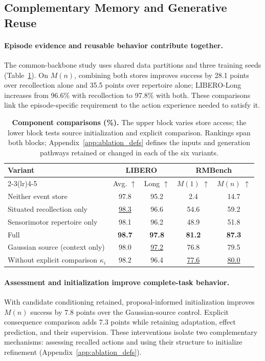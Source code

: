 \subsection{Complementary Memory and Generative Reuse}
\label{sec:ablations}
\paragraph{Episode evidence and reusable behavior contribute together.}
The common-backbone study uses shared data partitions and three training seeds (Table~\ref{tab:ablation}).
On $M(n)$, combining both stores improves success by 28.1 points over recollection alone and 35.5 points over repertoire alone; LIBERO-Long increases from 96.6\% with recollection to 97.8\% with both.
These comparisons link the episode-specific requirement to the action experience needed to satisfy it.
\begin{table}[t]
\centering
\small
\setlength{\tabcolsep}{12pt}
\renewcommand{\arraystretch}{1.08}
\caption{\textbf{Component comparisons (\%).} The upper block varies store access; the lower block tests source initialization and explicit comparison. Rankings span both blocks; Appendix~\ref{app:ablation_defs} defines the inputs and generation pathways retained or changed in each of the six variants.}
\label{tab:ablation}
\begin{tabular}{@{}lcccc@{}}
\toprule
\multirow[c]{2}{*}{Variant} & \multicolumn{2}{c}{LIBERO} & \multicolumn{2}{c}{RMBench} \\
\cmidrule(lr){2-3}\cmidrule(lr){4-5}
& Avg. $\uparrow$ & Long $\uparrow$ & $M(1)$ $\uparrow$ & $M(n)$ $\uparrow$ \\
\midrule
Neither event store & 97.8 & 95.2 & 2.4 & 14.7 \\
Situated recollection only & \underline{98.3} & 96.6 & 54.6 & 59.2 \\
Sensorimotor repertoire only & 98.1 & 96.2 & 48.9 & 51.8 \\
\rowcolor{blue!7}
Full \method{} & \textbf{98.7} & \textbf{97.8} & \textbf{81.2} & \textbf{87.3} \\
\midrule
Gaussian source (context only) & 98.0 & \underline{97.2} & 76.8 & 79.5 \\
Without explicit comparison $\kappa_i$ & 98.2 & 96.4 & \underline{77.6} & \underline{80.0} \\
\bottomrule
\end{tabular}
\end{table}
\paragraph{Assessment and initialization improve complete-task behavior.}
With candidate conditioning retained, proposal-informed initialization improves $M(n)$ success by 7.8 points over the Gaussian-source control.
Explicit consequence comparison adds 7.3 points while retaining adaptation, effect prediction, and their supervision.
These interventions isolate two complementary mechanisms: assessing recalled actions and using their structure to initialize refinement (Appendix~\ref{app:ablation_defs}).

